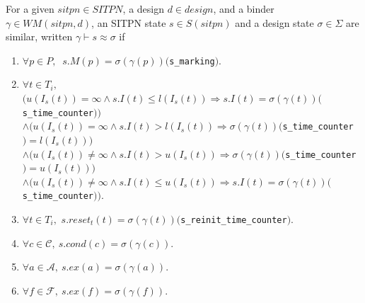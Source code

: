 \begin{definition}
  \label{def:state-sim}
  For a given $sitpn\in{}SITPN$, a \hvhdl{} design $d\in{}design$, and
  a binder $\gamma\in{}WM(sitpn,d)$, an SITPN state $s\in{}S(sitpn)$
  and a design state $\sigma\in\Sigma$ are similar, written
  $\gamma\vdash{}s\approx\sigma$ if
  \begin{enumerate}
  \item\label{item:sim-mark} $\forall{}p\in{}P,$
    $~s.M(p)=\sigma(\gamma(p))($\texttt{s\_marking}$)$.
  \item\label{item:sim-tc}
    $\forall{}t\in{}T_i,$\\
    $\big(u(I_s(t))=\infty\land{}s.I(t)\le{}l(I_s(t))\Rightarrow{}s.I(t)=\sigma(\gamma(t))($\texttt{s\_time\_counter}$)\big)$\\
    $\land\big(u(I_s(t))=\infty\land{}s.I(t)>{}l(I_s(t))\Rightarrow{}\sigma(\gamma(t))($\texttt{s\_time\_counter}$)=l(I_s(t))\big)$\\
    $\land\big(u(I_s(t))\neq\infty\land{}s.I(t)>{}u(I_s(t))\Rightarrow{}\sigma(\gamma(t))($\texttt{s\_time\_counter}$)=u(I_s(t))\big)$\\
    $\land\big(u(I_s(t))\neq\infty\land{}s.I(t)\le{}u(I_s(t))\Rightarrow{}s.I(t)=\sigma(\gamma(t))($\texttt{s\_time\_counter}$)\big)$.
  \item\label{item:sim-reset} $\forall{}t\in{}T_i,$
    $s.reset_t(t)=\sigma(\gamma(t))($\texttt{s\_reinit\_time\_counter}$)$.
  \item\label{item:sim-cond}
    $\forall{}c\in\mathcal{C},~s.cond(c)=\sigma(\gamma(c))$.
  \item\label{item:sim-act}
    $\forall{}a\in\mathcal{A},~s.ex(a)=\sigma(\gamma(a))$.
  \item\label{item:sim-fun}
    $\forall{}f\in\mathcal{F},~s.ex(f)=\sigma(\gamma(f))$.
  \end{enumerate}
\end{definition}

